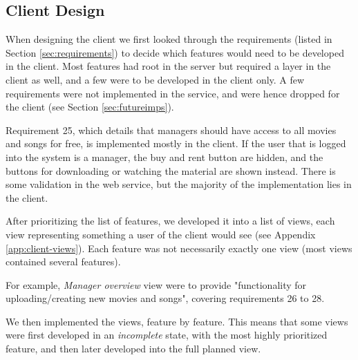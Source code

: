 \subsection{Client Design}

When designing the client we first looked through the requirements (listed in
Section \ref{sec:requirements}) to decide which features would need to be
developed in the client. Most features had root in the server but required a
layer in the client as well, and a few were to be developed in the client only.
A few requirements were not implemented in the service, and were hence dropped
for the client (see Section \ref{sec:futureimps}).

Requirement 25, which details that managers should have access to
all movies and songs for free, is implemented mostly in the client. If the user
that is logged into the system is a manager, the buy and rent button are hidden,
and the buttons for downloading or watching the material are shown instead. There
is some validation in the web service, but the majority of the implementation lies
in the client.

After prioritizing the list of features, we developed it into a list of views,
each view representing something a user of the client would see (see Appendix
\ref{app:client-views}). Each feature was not necessarily exactly one view (most
views contained several features).

For example, \emph{Manager overview} view were to provide "functionality
for uploading/creating new movies and songs", covering requirements 26 to 28.

We then implemented the views, feature by feature. This means that some views
were first developed in an \emph{incomplete} state, with the most highly
prioritized feature, and then later developed into the full planned view.

